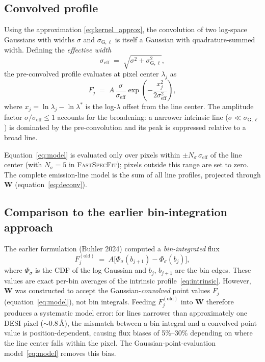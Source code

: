 \documentclass[12pt]{article}
\newcommand{\lstar}{\lambda^{*}}
\newcommand{\sGl}{\sigma_{\mathrm{G},\ell}}   %
\newcommand{\seff}{\sigma_{\mathrm{eff}}}
\newcommand{\W}{\mathbf{W}}
\begin{document}
\subsection{Convolved profile}
\label{ssec:convolved}

Using the approximation \eqref{eq:kernel_approx}, the convolution of two
log-space Gaussians with widths $\sigma$ and $\sGl$ is itself a Gaussian
with quadrature-summed width.  Defining the \emph{effective width}
\begin{equation}
  \seff \;=\; \sqrt{\sigma^2 + \sGl^2},
  \label{eq:seff}
\end{equation}
the pre-convolved profile evaluates at pixel center $\lambda_j$ as
\begin{equation}
  \boxed{
  F_j \;=\; A\,\frac{\sigma}{\seff}
  \exp\!\left(-\frac{x_j^2}{2\seff^2}\right),
  }
  \label{eq:model}
\end{equation}
where $x_j = \ln\lambda_j - \ln\lstar$ is the log-$\lambda$ offset from
the line center.  The amplitude factor $\sigma/\seff \leq 1$ accounts for
the broadening: a narrower intrinsic line ($\sigma \ll \sGl$) is dominated
by the pre-convolution and its peak is suppressed relative to a broad line.

Equation~\eqref{eq:model} is evaluated only over pixels within
$\pm N_\sigma\,\seff$ of the line center (with $N_\sigma = 5$ in
\textsc{FastSpecFit}); pixels outside this range are set to zero.  The
complete emission-line model is the sum of all line profiles, projected
through $\W$ (equation~\ref{eq:deconv}).

\subsection{Comparison to the earlier bin-integration approach}
\label{ssec:comparison}

The earlier formulation (Buhler 2024) computed a \emph{bin-integrated} flux
\begin{equation}
  F_j^{(\mathrm{old})}
  \;=\; A\bigl[\Phi_\sigma(b_{j+1}) - \Phi_\sigma(b_j)\bigr],
\end{equation}
where $\Phi_\sigma$ is the CDF of the log-Gaussian and $b_j$,
$b_{j+1}$ are the bin edges.  These values are exact per-bin averages
of the intrinsic profile~\eqref{eq:intrinsic}.  However, $\W$ was
constructed to accept the Gaussian-\emph{convolved} point values $F_j$
(equation~\ref{eq:model}), not bin integrals.  Feeding
$F_j^{(\mathrm{old})}$ into $\W$ therefore produces a systematic model
error: for lines narrower than approximately one DESI pixel
(${\sim}0.8$\,\AA), the mismatch between a bin integral and a
convolved point value is position-dependent, causing flux biases of
5\%--30\% depending on where the line center falls within the pixel.
The Gaussian-point-evaluation model~\eqref{eq:model} removes this
bias.
\end{document}
